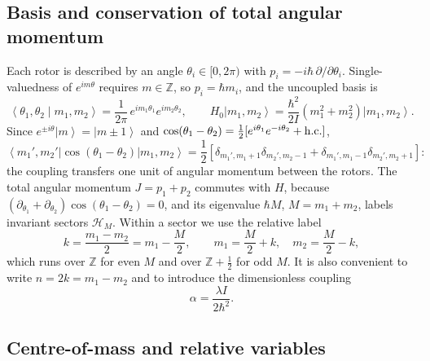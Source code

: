 \documentclass[preprint,12pt]{elsarticle}
\newcommand{\ket}[1]{\left|#1\right\rangle}
\newcommand{\bra}[1]{\left\langle#1\right|}
\newcommand{\braket}[2]{\left\langle#1\middle|#2\right\rangle}
\begin{document}
\subsection{Basis and conservation of total angular momentum}

Each rotor is described by an angle $\theta_{i}\in[0,2\pi)$ with
$p_{i}=-i\hbar\,\partial/\partial\theta_{i}$. Single-valuedness of
$e^{im\theta}$ requires $m\in\mathbb{Z}$, so $p_{i}=\hbar m_{i}$, and the
uncoupled basis is
\begin{equation}
\braket{\theta_{1},\theta_{2}}{m_{1},m_{2}}
=\frac{1}{2\pi}\,e^{im_{1}\theta_{1}}e^{im_{2}\theta_{2}},\qquad
H_{0}\ket{m_{1},m_{2}}=\frac{\hbar^{2}}{2I}\left(m_{1}^{2}+m_{2}^{2}\right)
\ket{m_{1},m_{2}} .
\label{eq:basis}
\end{equation}
Since $e^{\pm i\theta}\ket{m}=\ket{m\pm1}$ and
$\cos(\theta_{1}-\theta_{2})=\tfrac12[e^{i\theta_{1}}e^{-i\theta_{2}}+{\rm h.c.}]$,
\begin{equation}
\bra{m_{1}',m_{2}'}\cos(\theta_{1}-\theta_{2})\ket{m_{1},m_{2}}
=\frac12\left[\delta_{m_{1}',m_{1}+1}\delta_{m_{2}',m_{2}-1}
+\delta_{m_{1}',m_{1}-1}\delta_{m_{2}',m_{2}+1}\right]:
\label{eq:V}
\end{equation}
the coupling transfers one unit of angular momentum between the rotors. The
total angular momentum $J=p_{1}+p_{2}$ commutes with $H$, because
$(\partial_{\theta_{1}}+\partial_{\theta_{2}})\cos(\theta_{1}-\theta_{2})=0$, and
its eigenvalue $\hbar M$, $M=m_{1}+m_{2}$, labels invariant sectors
$\mathcal{H}_{M}$. Within a sector we use the relative label
\begin{equation}
k=\frac{m_{1}-m_{2}}{2}=m_{1}-\frac{M}{2},\qquad
m_{1}=\frac{M}{2}+k,\quad m_{2}=\frac{M}{2}-k,
\label{eq:k}
\end{equation}
which runs over $\mathbb{Z}$ for even $M$ and over $\mathbb{Z}+\tfrac12$ for
odd $M$. It is also convenient to write $n=2k=m_{1}-m_{2}$ and to introduce the
dimensionless coupling
\begin{equation}
\alpha=\frac{\lambda I}{2\hbar^{2}} .
\label{eq:alpha}
\end{equation}

\subsection{Centre-of-mass and relative variables}
\label{sec:cmrel}
\end{document}
